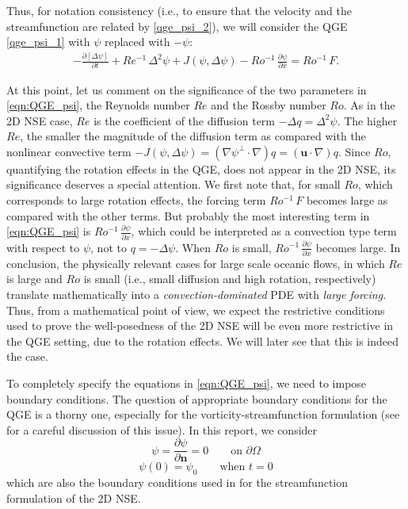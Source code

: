 Thus, for notation consistency (i.e., to ensure that the velocity and the
streamfunction are related by \eqref{qge_psi_2}), we will consider the QGE
\eqref{qge_psi_1} with $\psi$ replaced with $-\psi$:
\begin{align}
  -\frac{\partial \left[ \Delta \psi \right]}{\partial t}
    + Re^{-1} \, \Delta^2 \psi + J(\psi , \Delta \psi)
    - Ro^{-1} \, \frac{\partial \psi}{\partial x} = Ro^{-1} \, F .
    \label{eqn:QGE_psi}
\end{align}

At this point, let us comment on the significance of the two parameters in
\eqref{eqn:QGE_psi}, the Reynolds number $Re$ and the Rossby number $Ro$.  As in
the 2D NSE case, $Re$ is the coefficient of the diffusion term $- \Delta q =
\Delta^2 \psi$.  The higher $Re$, the smaller the magnitude of the diffusion
term as compared with the nonlinear convective term $- J(\psi, \Delta \psi) = (
\nabla \psi^{\perp} \cdot \nabla ) q = (\mathbf{u} \cdot \nabla ) q$.  Since
$Ro$, quantifying the rotation effects in the QGE, does not appear in the 2D
NSE, its significance deserves a special attention.  We first note that, for
small $Ro$, which corresponds to large rotation effects, the forcing term
$Ro^{-1} \, F$ becomes large as compared with the other terms.  But probably the
most interesting term in \eqref{eqn:QGE_psi} is $\displaystyle Ro^{-1} \,
\frac{\partial \psi}{\partial x}$, which could be interpreted as a convection
type term with respect to $\psi$, not to $q = -\Delta \psi$.  When $Ro$ is
small, $\displaystyle Ro^{-1} \, \frac{\partial \psi}{\partial x}$ becomes
large.  In conclusion, the physically relevant cases for large scale oceanic
flows, in which $Re$ is large and $Ro$ is small (i.e., small diffusion and high
rotation, respectively) translate mathematically into a
\emph{convection-dominated} PDE with \emph{large forcing}.  Thus, from a
mathematical point of view, we expect the restrictive conditions used to prove
the well-posedness of the 2D NSE \cite{Girault79,Girault86,Gunzburger89} will be
even more restrictive in the QGE setting, due to the rotation effects.  We will
later see that this is indeed the case.

To completely specify the equations in \eqref{eqn:QGE_psi}, we need to impose
boundary conditions.  The question of appropriate boundary conditions for the
QGE is a thorny one, especially for the vorticity-streamfunction formulation
(see \cite{Vallis06,Cummins} for a careful discussion of this issue).  In this
report, we consider
\begin{equation}
  \psi = \frac{\partial \psi}{\partial \mathbf{n}} = 0 \qquad \text{on } \partial \Omega
  \label{eqn:QGEBCs}
\end{equation}
\begin{equation}
  \psi(0) = \psi_0 \qquad \text{when } t = 0
  \label{eqn:QGEICs}
\end{equation}
which are also the boundary conditions used in \cite{Gunzburger89} for the
streamfunction formulation of the 2D NSE.

